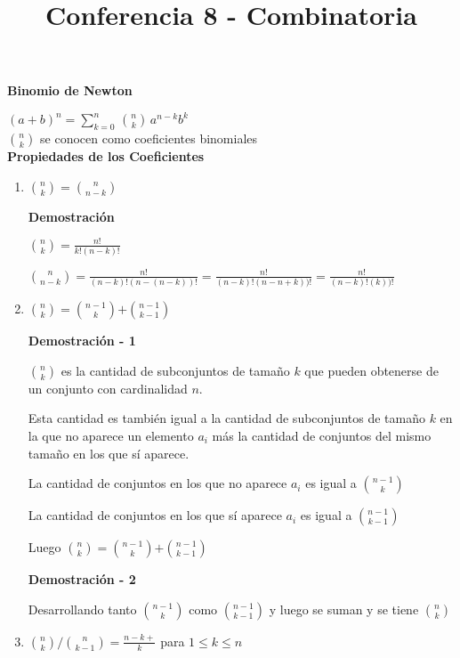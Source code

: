 \documentclass[a4paper,12pt]{report}
\title{Conferencia 8 - Combinatoria}
\author{}
\begin{document}
\maketitle



\textbf{Binomio de Newton}


$(a+b)^n=\sum^n_{k=0}\,$${n}\choose{k}$$\, a^{n-k}b^k$\\

${n}\choose{k}$ se conocen como coeficientes binomiales\\

\textbf{Propiedades de los Coeficientes}

\begin{enumerate}
 \item ${n}\choose{k}$$=$${n}\choose{n-k}$
 
 \textbf{Demostración}
 
 ${n}\choose{k}$$=\frac{n!}{k!(n-k)!}$  
 
 ${n}\choose{n-k}$$=\frac{n!}{(n-k)!(n-(n-k))!}=\frac{n!}{(n-k)!(n-n+k))!}=\frac{n!}{(n-k)!(k))!}$  
 
 \item ${n}\choose{k}$$=$${n-1}\choose{k}$$+$${n-1}\choose{k-1}$
 
 \textbf{Demostración - 1}
 
 ${n}\choose{k}$ es la cantidad de subconjuntos de tamaño $k$ que pueden obtenerse de un conjunto con cardinalidad $n$.
 
 Esta cantidad es también igual a la cantidad de subconjuntos de tamaño $k$ en la que no aparece un elemento $a_i$ más la cantidad de conjuntos del mismo tamaño en los que sí aparece.
 
 La cantidad de conjuntos en los que no aparece $a_i$ es igual a ${n-1}\choose{k}$
 
 La cantidad de conjuntos en los que sí aparece $a_i$ es igual a ${n-1}\choose{k-1}$
 
 Luego ${n}\choose{k}$$=$${n-1}\choose{k}$$+$${n-1}\choose{k-1}$
 
 \textbf{Demostración - 2}
 
 Desarrollando tanto ${n-1}\choose{k}$ como ${n-1}\choose{k-1}$ y luego se suman y se tiene
 ${n}\choose{k}$
 
 \item ${n}\choose{k}$$/$${n}\choose{k-1}$$=\frac{n-k+}{k}$ para $1\leq k \leq n$\\
 

\end{enumerate}
\end{document}

